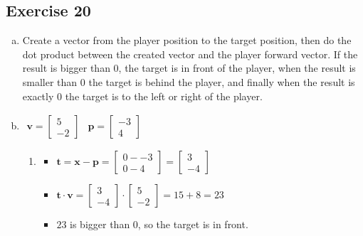 \documentclass[11pt]{article}
\begin{document}
\subsection{Exercise 20}

\begin{enumerate}[a.]
\item Create a vector from the player position to the target position, then do the dot product between the created vector and the player forward vector. If the result is bigger than $0$, the target is in front of the player, when the result is smaller than $0$ the target is behind the player, and finally when the result is exactly $0$ the target is to the left or right of the player.

\item

$
\begin{array}{ll}
\textbf{v}= \begin{bmatrix}
5 \\ -2
\end{bmatrix} & \textbf{p}= \begin{bmatrix}
-3 \\ 4
\end{bmatrix}
\end{array}
$

\begin{enumerate}[1.)]
	\item  %
	\begin{itemize}
		\item $\textbf{t}=\textbf{x}-\textbf{p}=\begin{bmatrix}
0 - -3 \\ 0 - 4		
\end{bmatrix}=\begin{bmatrix}
3 \\ -4	
\end{bmatrix}$
		\item $\textbf{t} \cdot \textbf{v} =
\begin{bmatrix}
3 \\ -4	
\end{bmatrix}\cdot
\begin{bmatrix}
5 \\ -2	
\end{bmatrix}=
15+8=23$
		\item $23$ is bigger than $0$, so the target is in front.
	\end{itemize}
	

\end{enumerate}
\end{enumerate}
\end{document}
